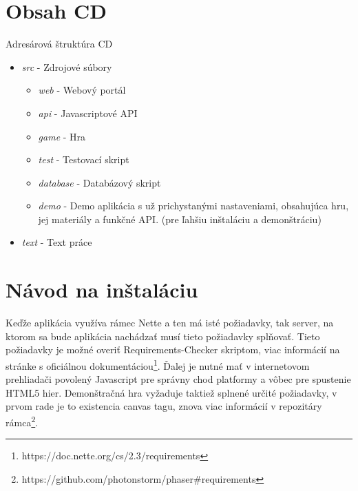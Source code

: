 \chapter{Obsah CD}
\label{pr:cd}
Adresárová štruktúra CD
\begin{itemize}
\item \textit{src} - Zdrojové súbory
    \begin{itemize}
    \item \textit{web} - Webový portál
    \item \textit{api} - Javascriptové API
    \item \textit{game} - Hra
    \item \textit{test} - Testovací skript
    \item \textit{database} - Databázový skript
    \item \textit{demo} - Demo aplikácia s už prichystanými nastaveniami, obsahujúca hru, jej materiály a funkčné API. (pre ľahšiu inštaláciu a demonštráciu)
    \end{itemize}
\item \textit{text} - Text práce
\end{itemize}

\chapter{Návod na inštaláciu}
\label{instalacia}
Keďže aplikácia využíva rámec Nette a ten má isté požiadavky, tak server, na ktorom sa bude aplikácia nachádzať musí tieto požiadavky splňovať. Tieto požiadavky je možné overiť Requirements-Checker skriptom, viac informácií na stránke s oficiálnou dokumentáciou\footnote{https://doc.nette.org/cs/2.3/requirements}. Ďalej je nutné mať v internetovom prehliadači povolený Javascript pre správny chod platformy a vôbec pre spustenie HTML5 hier. Demonštračná hra vyžaduje taktiež splnené určité požiadavky, v prvom rade je to existencia canvas tagu, znova viac informácií v repozitáry rámca\footnote{https://github.com/photonstorm/phaser\#requirements}.
